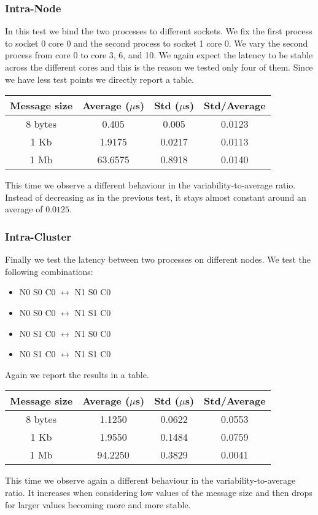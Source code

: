 \subsubsection{Intra-Node}
    In this test we bind the two processes to different sockets. We fix
    the first process to socket 0 core 0 and the second process to socket
    1 core 0. We vary the second process from core 0 to core 3, 6, and 10.
    We again expect the latency to be stable across the different cores and
    this is the reason we tested only four of them. Since we have less test
    points we directly report a table.
    \begin{table}[H]
        \centering
        \begin{tabular}{|c|c|c|c|}
            \hline
            \textbf{Message size} & \textbf{Average ($\mu$s)} & \textbf{Std ($\mu$s)} & \textbf{Std/Average} \\
            \hline
            8 bytes & 0.405 & 0.005 & 0.0123 \\
            1 Kb & 1.9175 & 0.0217 & 0.0113 \\
            1 Mb & 63.6575 & 0.8918 & 0.0140 \\
            \hline
        \end{tabular}
    \end{table}
    This time we observe a different behaviour in the variability-to-average
    ratio. Instead of decreasing as in the previous test, it stays almost
    constant around an average of $0.0125$.

\subsubsection{Intra-Cluster}
    Finally we test the latency between two processes on different nodes.
    We test the following combinations:
    \begin{itemize}
        \item N0 S0 C0 $\leftrightarrow$ N1 S0 C0
        \item N0 S0 C0 $\leftrightarrow$ N1 S1 C0
        \item N0 S1 C0 $\leftrightarrow$ N1 S0 C0
        \item N0 S1 C0 $\leftrightarrow$ N1 S1 C0
    \end{itemize}
    Again we report the results in a table.
    \begin{table}[H]
        \centering
        \begin{tabular}{|c|c|c|c|}
            \hline
            \textbf{Message size} & \textbf{Average ($\mu$s)} & \textbf{Std ($\mu$s)} & \textbf{Std/Average} \\
            \hline
            8 bytes & 1.1250 & 0.0622 & 0.0553 \\
            1 Kb & 1.9550 & 0.1484 & 0.0759 \\
            1 Mb & 94.2250 & 0.3829 & 0.0041 \\
            \hline
        \end{tabular}
    \end{table}
    This time we observe again a different behaviour in the variability-to-average
    ratio. It increases when considering low values of the message size and
    then drops for larger values becoming more and more stable.
